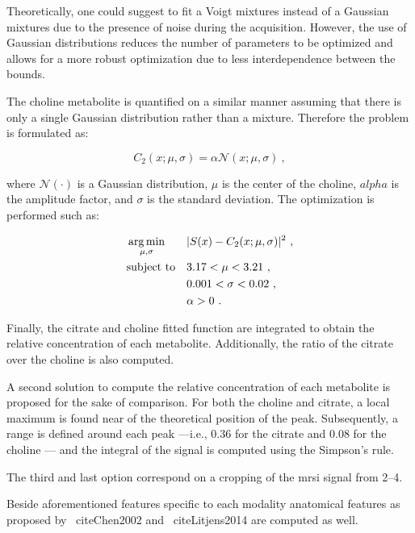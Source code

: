 Theoretically, one could suggest to fit a Voigt mixtures instead of a Gaussian mixtures due to the presence of noise during the acquisition.
However, the use of Gaussian distributions reduces the number of parameters to be optimized and allows for a more robust optimization due to less interdependence between the bounds.

The choline metabolite is quantified on a similar manner assuming that there is only a single Gaussian distribution rather than a mixture.
Therefore the problem is formulated as:

\begin{equation}
  C_2(x; \mu, \sigma) = \alpha \mathcal{N}(x; \mu, \sigma) \ ,
  \label{eq:costcho}
\end{equation}

\noindent where $\mathcal{N}(\cdot)$ is a Gaussian distribution, $\mu$ is the center of the choline, $alpha$ is the amplitude factor, and $\sigma$ is the standard deviation. The optimization is performed such as:

\begin{equation}
\begin{aligned}
& \operatorname*{arg\,min}_{\mathbf{\mu, \sigma}} 
& & | S(x) - C_2(x; \mu, \sigma) |^{2} \ , \label{eq:mincostcho} \\
& \text{subject to}
& & 3.17 < \mu < 3.21 \ , \\
&&& 0.001 < \sigma < 0.02 \ , \\
&&& \alpha > 0 \ .
\end{aligned}
\end{equation}

Finally, the citrate and choline fitted function are integrated to obtain the relative concentration of each metabolite.
Additionally, the ratio of the citrate over the choline is also computed.

A second solution to compute the relative concentration of each metabolite is proposed for the sake of comparison.
For both the choline and citrate, a local maximum is found near of the theoretical position of the peak.
Subsequently, a range is defined around each peak ---i.e., \SI{0.36}{\ppm} for the citrate and \SI{0.08}{\ppm} for the choline --- and the integral of the signal is computed using the Simpson's rule.

The third and last option correspond on a cropping of the \ac{mrsi} signal from \SIrange{2}{4}{\ppm}.

Beside aforementioned features specific to each modality anatomical features as proposed by \citeauthor{Chen2002}~cite{Chen2002} and \citeauthor{Litjens2014}~cite{Litjens2014} are computed as well. 

